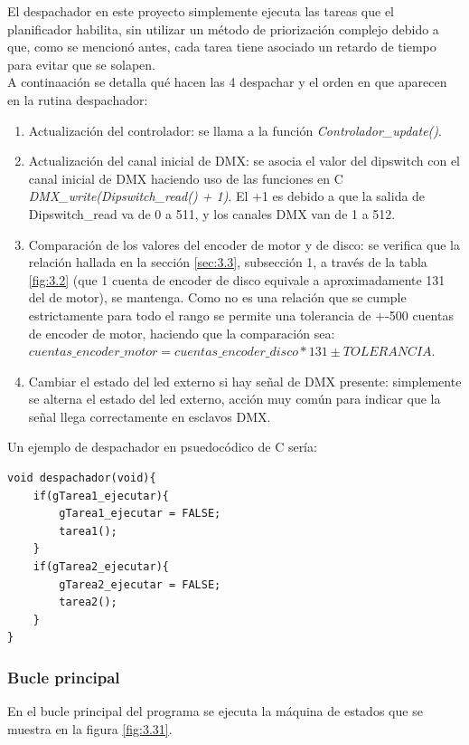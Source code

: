 El despachador en este proyecto simplemente ejecuta las tareas que el planificador habilita, sin utilizar un método de priorización complejo debido a que, como se mencionó antes, cada tarea tiene asociado un retardo de tiempo para evitar que se solapen.\\
A continaación se detalla qué hacen las 4 despachar y el orden en que aparecen en la rutina despachador:
\begin{enumerate}
	\item Actualización del controlador: se llama a la función \textit{Controlador\_update()}.
	\item Actualización del canal inicial de DMX: se asocia el valor del dipswitch con el canal inicial de DMX haciendo uso de las funciones en C \textit{DMX\_write(Dipswitch\_read() + 1)}. El +1 es debido a que la salida de Dipswitch\_read va de 0 a 511, y los canales DMX van de 1 a 512.
	\item Comparación de los valores del encoder de motor y de disco: se verifica que la relación hallada en la sección \ref{sec:3.3}, subsección 1, a través de la tabla \ref{fig:3.2} (que 1 cuenta de encoder de disco equivale a aproximadamente 131 del de motor), se mantenga. Como no es una relación que se cumple estrictamente para todo el rango se permite una tolerancia de +-500 cuentas de encoder de motor, haciendo que la comparación sea: \( cuentas\_encoder\_motor = cuentas\_encoder\_disco*131 \pm TOLERANCIA \).
	\item Cambiar el estado del led externo si hay señal de DMX presente: simplemente se alterna el estado del led externo, acción muy común para indicar que la señal llega correctamente en esclavos DMX.
\end{enumerate}
Un ejemplo de despachador en psuedocódico de C sería:
\begin{lstlisting}[style=CStyle]
void despachador(void){
	if(gTarea1_ejecutar){
		gTarea1_ejecutar = FALSE;
		tarea1();
	}
	if(gTarea2_ejecutar){
		gTarea2_ejecutar = FALSE;
		tarea2();
	}
}
\end{lstlisting}


\subsubsection{Bucle principal}
En el bucle principal del programa se ejecuta la máquina de estados que se muestra en la figura \ref{fig:3.31}. 

